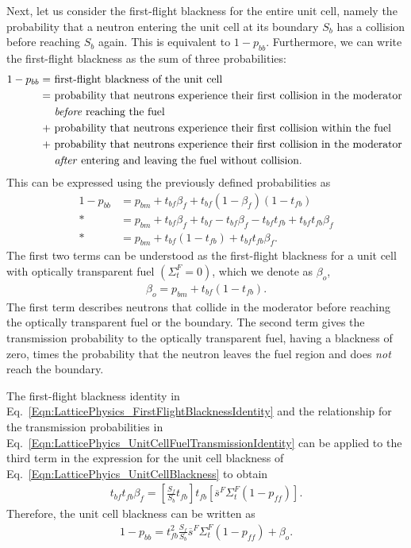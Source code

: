 Next, let us consider the first-flight blackness for the entire unit cell, namely the probability that a neutron entering the unit cell at its boundary $S_b$ has a collision before reaching $S_b$ again. This is equivalent to $1 - p_{bb}$. Furthermore, we can write the first-flight blackness as the sum of three probabilities:
\begin{align}
  1 - p_{bb} = &\text{ first-flight blackness of the unit cell} \nonumber \\*
             = &\text{ probability that neutrons experience their first collision in the moderator } \nonumber \\*
               &\text{ \emph{before} reaching the fuel} \nonumber \\*
             + &\text{ probability that neutrons experience their first collision within the fuel} \nonumber \\*
             + &\text{ probability that neutrons experience their first collision in the moderator } \nonumber \\*
               &\text{ \emph{after} entering and leaving the fuel without collision.} \nonumber
\end{align}
This can be expressed using the previously defined probabilities as
\begin{align}
  1 - p_{bb} &= p_{bm} + t_{bf}\beta_f + t_{bf} ( 1 - \beta_f ) ( 1 - t_{fb} ) \nonumber \\*
             &= p_{bm} + t_{bf}\beta_f + t_{bf} - t_{bf} \beta_f - t_{bf} t_{fb} + t_{bf} t_{fb} \beta_f \nonumber \\*
             &= p_{bm} + t_{bf}( 1 - t_{fb} ) + t_{bf} t_{fb} \beta_f . \label{Eqn:LatticePhyics_UnitCellBlackness}
\end{align}
The first two terms can be understood as the first-flight blackness for a unit cell with optically transparent fuel $(\Sigma_t^F = 0)$, which we denote as $\beta_o$,
\begin{align}
  \beta_o = p_{bm} + t_{bf}( 1 - t_{fb} ) .
\end{align}
The first term describes neutrons that collide in the moderator before reaching the optically transparent fuel or the boundary. The second term gives the transmission probability to the optically transparent fuel, having a blackness of zero, times the probability that the neutron leaves the fuel region and does \emph{not} reach the boundary.

The first-flight blackness identity in Eq.~\eqref{Eqn:LatticePhysics_FirstFlightBlacknessIdentity} and the relationship for the transmission probabilities in Eq.~\eqref{Eqn:LatticePhyics_UnitCellFuelTransmissionIdentity} can be applied to the third term in the expression for the unit cell blackness of Eq.~\eqref{Eqn:LatticePhyics_UnitCellBlackness} to obtain
\begin{align}
  t_{bf} t_{fb} \beta_f =  \left[ \frac{S_f}{S_b} t_{fb}  \right] t_{fb}  \left[ \overline{s}^F \Sigma_t^F ( 1 - p_{ff} ) \right] .
\end{align}
Therefore, the unit cell blackness can be written as
\begin{align}
  1 - p_{bb} = t_{fb}^2 \frac{S_f}{S_b} \overline{s}^F \Sigma_t^F ( 1 - p_{ff} ) + \beta_o.
\end{align}

